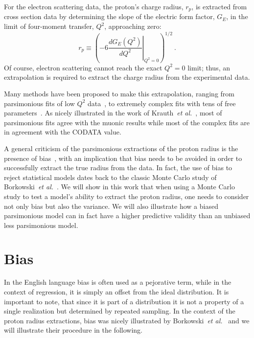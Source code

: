 \documentclass[10pt,aps,prc,twocolumn]{revtex4-1}
\begin{document}
For the electron scattering data, the proton's charge radius, $r_p$, is extracted from
cross section data by determining the slope of the electric form factor, $G_E$, in the
limit of four-moment transfer, $Q^2$, approaching zero: 
\begin{equation}
\label{eq:radius}
  r_p \equiv %
    \left( -6  \left. \frac{dG_E(Q^2)}{dQ^2}
    \right|_{Q^{2}=0} \right)^{1/2} \>.
\end{equation}
Of course, electron scattering cannot reach the exact $Q^2 = 0$ limit; thus,
an extrapolation is required to extract the charge radius from the experimental data.

Many methods have been proposed to make this extrapolation,
ranging from parsimonious fits of low $Q^2$ data~\cite{Rosenfelder:1999cd,Griffioen:2015hta,Horbatsch:2016ilr,Higinbotham:2015rja},
to extremely complex fits with tens of free parameters~\cite{Bernauer:2013tpr,Lee:2015jqa}.   
As nicely illustrated in the work of Krauth~{\it{et al.}}~\cite{Krauth:2017ijq}, most of 
parsimonious fits agree with the muonic results while most of the complex fits 
are in agreement with the CODATA value.

A general criticism of the parsimonious extractions of the proton radius is the presence of bias~\cite{Sick:2017aor},
with an implication that bias needs to be avoided in order to successfully extract the true radius from the data.
In fact, the use of bias to reject statistical models dates back to the classic Monte Carlo 
study of Borkowski~{\it{et al.}}~\cite{Borkowski:1975}. 
We will show in this work that when using a Monte Carlo study to test a model's ability
to extract the proton radius, one needs to consider not only bias but also the variance.
We will also illustrate how a biased parsimonious model can in fact have a higher predictive 
validity than an unbiased less parsimonious model.


\section{Bias}

In the English language bias is often used as a pejorative term, while in the context of regression, it is simply
an offset from the ideal distribution.   It is important to note, that since it is part of a distribution it
is not a property of a single realization but determined by repeated sampling.    In the context of the proton 
radius extractions, bias was nicely illustrated by Borkowski~{\it{et al.}}~\cite{Borkowski:1975} and we will
illustrate their procedure in the following.
\end{document}
